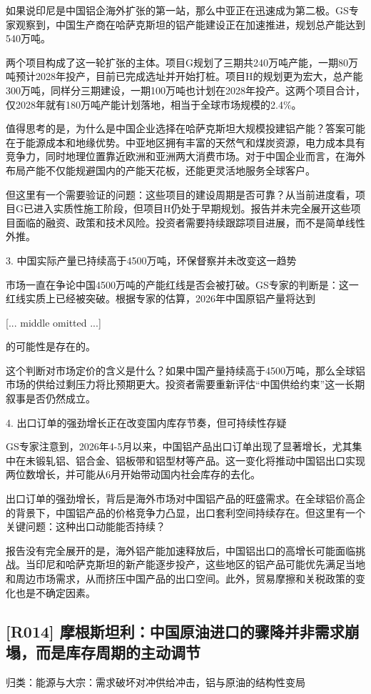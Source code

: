 \documentclass[11pt]{ctexart}
\begin{document}
如果说印尼是中国铝企海外扩张的第一站，那么中亚正在迅速成为第二极。GS专家观察到，中国生产商在哈萨克斯坦的铝产能建设正在加速推进，规划总产能达到540万吨。

两个项目构成了这一轮扩张的主体。项目G规划了三期共240万吨产能，一期80万吨预计2028年投产，目前已完成选址并开始打桩。项目H的规划更为宏大，总产能300万吨，同样分三期建设，一期100万吨也计划在2028年投产。这两个项目合计，仅2028年就有180万吨产能计划落地，相当于全球市场规模的2.4\%。

值得思考的是，为什么是中国企业选择在哈萨克斯坦大规模投建铝产能？答案可能在于能源成本和地缘优势。中亚地区拥有丰富的天然气和煤炭资源，电力成本具有竞争力，同时地理位置靠近欧洲和亚洲两大消费市场。对于中国企业而言，在海外布局产能不仅能规避国内的产能天花板，还能更灵活地服务全球客户。

但这里有一个需要验证的问题：这些项目的建设周期是否可靠？从当前进度看，项目G已进入实质性施工阶段，但项目H仍处于早期规划。报告并未完全展开这些项目面临的融资、政策和技术风险。投资者需要持续跟踪项目进展，而不是简单线性外推。

3. 中国实际产量已持续高于4500万吨，环保督察并未改变这一趋势

市场一直在争论中国4500万吨的产能红线是否会被打破。GS专家的判断是：这一红线实质上已经被突破。根据专家的估算，2026年中国原铝产量将达到

[... middle omitted ...]

的可能性是存在的。

这个判断对市场定价的含义是什么？如果中国产量持续高于4500万吨，那么全球铝市场的供给过剩压力将比预期更大。投资者需要重新评估“中国供给约束”这一长期叙事是否仍然成立。

4. 出口订单的强劲增长正在改变国内库存节奏，但可持续性存疑

GS专家注意到，2026年4-5月以来，中国铝产品出口订单出现了显著增长，尤其集中在未锻轧铝、铝合金、铝板带和铝型材等产品。这一变化将推动中国铝出口实现两位数增长，并可能从6月开始带动国内社会库存的去化。

出口订单的强劲增长，背后是海外市场对中国铝产品的旺盛需求。在全球铝价高企的背景下，中国铝产品的价格竞争力凸显，出口套利空间持续存在。但这里有一个关键问题：这种出口动能能否持续？

报告没有完全展开的是，海外铝产能加速释放后，中国铝出口的高增长可能面临挑战。当印尼和哈萨克斯坦的新产能逐步投产，这些地区的铝产品可能优先满足当地和周边市场需求，从而挤压中国产品的出口空间。此外，贸易摩擦和关税政策的变化也是不确定因素。

\subsection{[R014] 摩根斯坦利：中国原油进口的骤降并非需求崩塌，而是库存周期的主动调节}
{\small\color{refgray}归类：能源与大宗：需求破坏对冲供给冲击，铝与原油的结构性变局}
\end{document}
